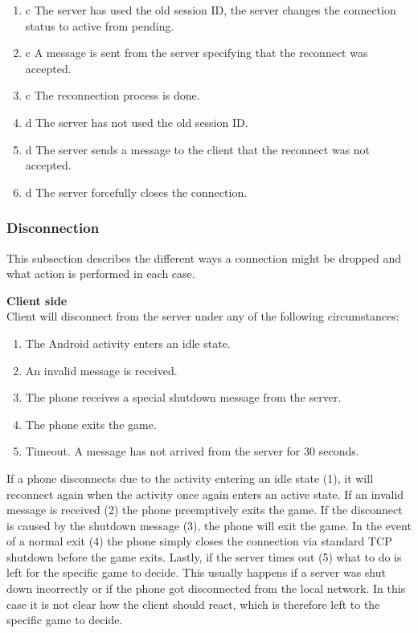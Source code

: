 \documentclass{article}
\begin{document}
\begin{enumerate}
\item c The server has used the old session ID, the server changes the connection status to active
from pending.

\item c A message is sent from the server specifying that the reconnect was accepted.

\item c The reconnection process is done.

\item d The server has not used the old session ID.

\item d The server sends a message to the client that the reconnect was not accepted.

\item d The server forcefully closes the connection.
\end{enumerate}
\subsubsection{Disconnection}
This subsection describes the different ways a connection might be dropped and what action is
performed in each case.

\begin{description}
\item \textbf{Client side}\\ Client will disconnect from the server under any of the following circumstances:
\end{description}
\begin{enumerate}
\item The Android activity enters an idle state.
\item An invalid message is received.
\item The phone receives a special shutdown message from the server.
\item The phone exits the game.
\item Timeout. A message has not arrived from the server for 30 seconds.
\end{enumerate}
If a phone disconnects due to the activity entering an idle state (1), it will reconnect again when
the activity once again enters an active state. If an invalid message is received (2) the phone
preemptively exits the game. If the disconnect is caused by the shutdown message (3), the phone
will exit the game. In the event of a normal exit (4) the phone simply closes the connection via
standard TCP shutdown before the game exits. Lastly, if the server times out (5) what to do is left for the specific game to decide. This usually happens if a server was shut down incorrectly or if the phone got disconnected from the local network. In this case it is not clear how the client should react, which is therefore left to the specific game to decide.
\end{document}

